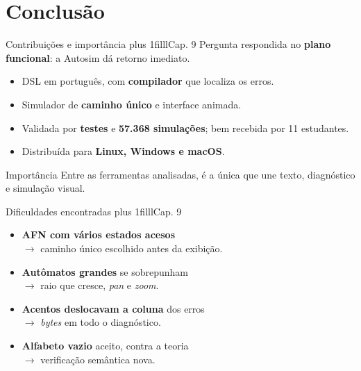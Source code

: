 \documentclass[aspectratio=169,12pt]{beamer}
\newcommand{\notexto}[1]{\hskip 0pt plus 1filll{\normalfont\small\color{white!85!acento}#1}}
\begin{document}
\section{Conclusão}

\begin{frame}{Contribuições e importância\notexto{Cap. 9}}
  Pergunta respondida no \textbf{plano funcional}: a Autosim dá retorno imediato.
  \begin{itemize}
    \item DSL em português, com \textbf{compilador} que localiza os erros.
    \item Simulador de \textbf{caminho único} e interface animada.
    \item Validada por \textbf{testes} e \textbf{57.368 simulações}; bem recebida por 11 estudantes.
    \item Distribuída para \textbf{Linux, Windows e macOS}.
  \end{itemize}
  \vspace{4pt}
  \begin{block}{Importância}
    Entre as ferramentas analisadas, é a única que une texto, diagnóstico e simulação visual.
  \end{block}
\end{frame}

\begin{frame}{Dificuldades encontradas\notexto{Cap. 9}}
  \begin{itemize}
    \item \textbf{AFN com vários estados acesos}\\
          $\to$ caminho único escolhido antes da exibição.
    \item \textbf{Autômatos grandes} se sobrepunham\\
          $\to$ raio que cresce, \textit{pan} e \textit{zoom}.
    \item \textbf{Acentos deslocavam a coluna} dos erros\\
          $\to$ \textit{bytes} em todo o diagnóstico.
    \item \textbf{Alfabeto vazio} aceito, contra a teoria\\
          $\to$ verificação semântica nova.
  \end{itemize}
\end{frame}
\end{document}

